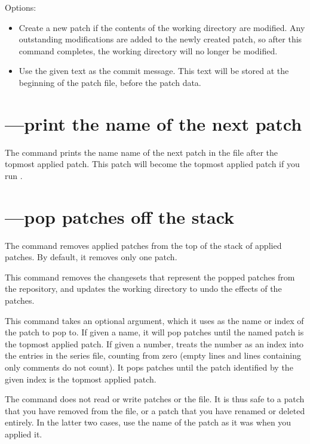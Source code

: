 Options:
\begin{itemize}
\item[\hgxopt{mq}{qnew}{-f}] Create a new patch if the contents of the
  working directory are modified.  Any outstanding modifications are
  added to the newly created patch, so after this command completes,
  the working directory will no longer be modified.
\item[\hgxopt{mq}{qnew}{-m}] Use the given text as the commit message.
  This text will be stored at the beginning of the patch file, before
  the patch data.
\end{itemize}

\section{---print the name of the next patch}

The  command prints the name name of the next patch in
the  file after the topmost applied patch.  This
patch will become the topmost applied patch if you run .

\section{---pop patches off the stack}

The  command removes applied patches from the top of the
stack of applied patches.  By default, it removes only one patch.

This command removes the changesets that represent the popped patches
from the repository, and updates the working directory to undo the
effects of the patches.

This command takes an optional argument, which it uses as the name or
index of the patch to pop to.  If given a name, it will pop patches
until the named patch is the topmost applied patch.  If given a
number,  treats the number as an index into the entries in
the series file, counting from zero (empty lines and lines containing
only comments do not count).  It pops patches until the patch
identified by the given index is the topmost applied patch.

The  command does not read or write patches or the
 file.  It is thus safe to  a patch that
you have removed from the  file, or a patch that you
have renamed or deleted entirely.  In the latter two cases, use the
name of the patch as it was when you applied it.

